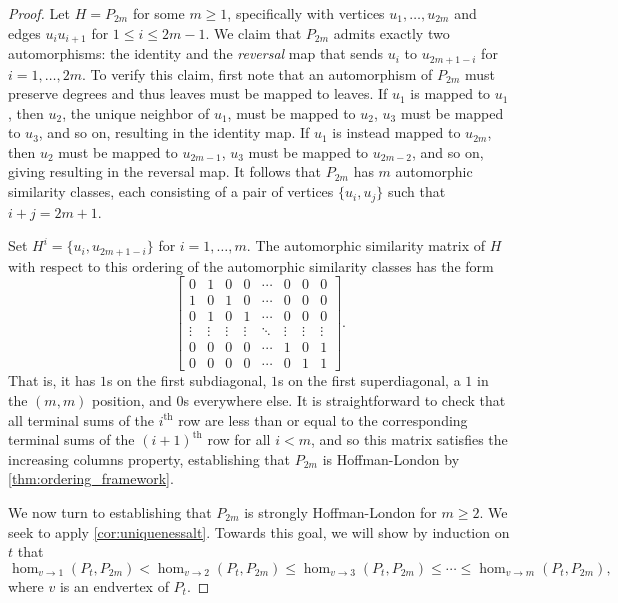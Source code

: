 \documentclass[10pt,a4paper]{amsart}
\newcommand{\homclass}[4]{\hom_{#1\to#2}(#3,#4)}
\newcommand{\ith}[1]{$#1^{\text{th}}$}
\begin{document}
\begin{proof}
Let $H = P_{2m}$ for some $m \ge 1$, specifically with vertices $u_1, \ldots, u_{2m}$ and edges $u_iu_{i+1}$ for $1 \le i \le 2m-1$. We claim that $P_{2m}$ admits exactly two automorphisms: the identity and the {\it reversal} map that sends $u_i$ to $u_{2m+1-i}$ for $i=1, \ldots, 2m$. To verify this claim, first note that an automorphism of $P_{2m}$ must preserve degrees and thus leaves must be mapped to leaves. If $u_1$ is mapped to $u_1$, then $u_2$, the unique neighbor of $u_1$, must be mapped to $u_2$, $u_3$ must be mapped to $u_3$, and so on, resulting in the identity map. If $u_1$ is instead mapped to $u_{2m}$, then $u_2$ must be mapped to $u_{2m-1}$, $u_3$ must be mapped to $u_{2m-2}$, and so on, giving resulting in the reversal map. It follows that $P_{2m}$ has $m$ automorphic similarity classes, each consisting of a pair of vertices $\{u_i,u_j\}$ such that $i+j=2m+1$. 

Set $H^i=\{u_i, u_{2m+1-i}\}$ for $i=1, \ldots, m$. The automorphic similarity matrix of $H$ with respect to this ordering of the automorphic similarity classes has the form 
\[ \begin{bmatrix}
0 & 1 & 0 & 0 & \cdots & 0 & 0 & 0\\
1 & 0 & 1 & 0 & \cdots & 0 & 0 & 0\\
0 & 1 & 0 & 1 & \cdots & 0 & 0 & 0\\
\vdots & \vdots & \vdots & \vdots & \ddots & \vdots & \vdots& \vdots\\
0 & 0 & 0 & 0 & \cdots & 1 & 0 & 1\\
0 & 0 & 0 & 0 & \cdots & 0 & 1 & 1
    \end{bmatrix}. \]
That is, it has $1$s on the first subdiagonal, $1$s on the first superdiagonal, a $1$ in the $(m,m)$ position, and $0$s everywhere else. It is straightforward to check that all terminal sums of the \ith{i} row are less than or equal to the corresponding terminal sums of the \ith{(i+1)} row for all $i < m$, and so this matrix satisfies the increasing columns property, establishing that $P_{2m}$ is Hoffman-London by \cref{thm:ordering_framework}.

We now turn to establishing that $P_{2m}$ is strongly Hoffman-London for $m \ge 2$. We seek to apply \cref{cor:uniquenessalt}. Towards this goal, we will show by induction on $t$ that
\begin{equation} \label{inq:paths}
\homclass{v}{1}{P_t}{P_{2m}} < \homclass{v}{2}{P_t}{P_{2m}} \le \homclass{v}{3}{P_t}{P_{2m}} \le \cdots \le \homclass{v}{m}{P_t}{P_{2m}},
\end{equation}
where $v$ is an endvertex of $P_t$.


\end{proof}
\end{document}
